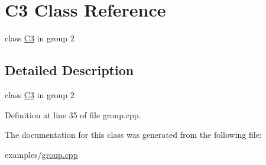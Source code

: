 \hypertarget{class_c3}{}\section{C3 Class Reference}
\label{class_c3}


class \mbox{\hyperlink{class_c3}{C3}} in group 2  




\subsection{Detailed Description}
class \mbox{\hyperlink{class_c3}{C3}} in group 2 

Definition at line 35 of file group.\+cpp.



The documentation for this class was generated from the following file\+:\begin{DoxyCompactItemize}
\item 
examples/\mbox{\hyperlink{group_8cpp}{group.\+cpp}}\end{DoxyCompactItemize}

